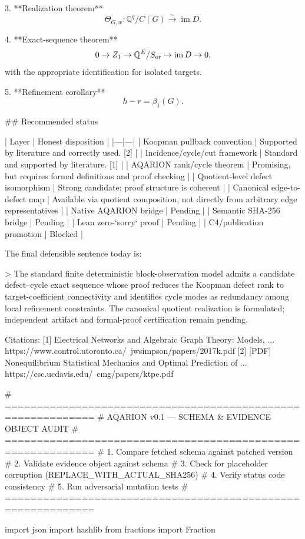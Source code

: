 3. **Realization theorem**
   $$
   \Theta_{G,w}:\mathbb Q^q/C(G)
   \overset{\sim}{\longrightarrow}
   \operatorname{im}D.
   $$

4. **Exact-sequence theorem**
   $$
   0\to Z_1
   \to\mathbb Q^E/S_{\rm or}
   \to\operatorname{im}D
   \to0,
   $$
   with the appropriate identification for isolated targets.

5. **Refinement corollary**
   $$
   h-r=\beta_1(G).
   $$

## Recommended status

| Layer | Honest disposition |
|---|---|
| Koopman pullback convention | Supported by literature and correctly used. [2] |
| Incidence/cycle/cut framework | Standard and supported by literature. [1] |
| AQARION rank/cycle theorem | Promising, but requires formal definitions and proof checking |
| Quotient-level defect isomorphism | Strong candidate; proof structure is coherent |
| Canonical edge-to-defect map | Available via quotient composition, not directly from arbitrary edge representatives |
| Native AQARION bridge | Pending |
| Semantic SHA-256 bridge | Pending |
| Lean zero-`sorry` proof | Pending |
| C4/publication promotion | Blocked |

The final defensible sentence today is:

> The standard finite deterministic block-observation model admits a candidate defect–cycle exact sequence whose proof reduces the Koopman defect rank to target-coefficient connectivity and identifies cycle modes as redundancy among local refinement constraints. The canonical quotient realization is formulated; independent artifact and formal-proof certification remain pending.

Citations:
[1] Electrical Networks and Algebraic Graph Theory: Models, ... https://www.control.utoronto.ca/~jwsimpson/papers/2017k.pdf
[2] [PDF] Nonequilibrium Statistical Mechanics and Optimal Prediction of ... https://csc.ucdavis.edu/~cmg/papers/ktpe.pdf

# ============================================================
# AQARION v0.1 — SCHEMA & EVIDENCE OBJECT AUDIT
# ============================================================
# 1. Compare fetched schema against patched version
# 2. Validate evidence object against schema
# 3. Check for placeholder corruption (REPLACE_WITH_ACTUAL_SHA256)
# 4. Verify status code consistency
# 5. Run adversarial mutation tests
# ============================================================

import json
import hashlib
from fractions import Fraction


